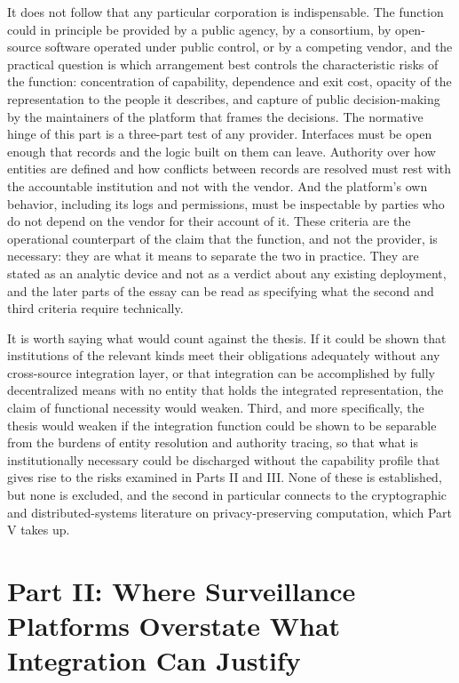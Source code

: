 \documentclass[11pt]{article}
\theoremstyle{plain}
\theoremstyle{definition}
\theoremstyle{remark}
\begin{document}
It does not follow that any particular corporation is indispensable. The function could in principle be provided by a public agency, by a consortium, by open-source software operated under public control, or by a competing vendor, and the practical question is which arrangement best controls the characteristic risks of the function: concentration of capability, dependence and exit cost, opacity of the representation to the people it describes, and capture of public decision-making by the maintainers of the platform that frames the decisions. The normative hinge of this part is a three-part test of any provider. Interfaces must be open enough that records and the logic built on them can leave. Authority over how entities are defined and how conflicts between records are resolved must rest with the accountable institution and not with the vendor. And the platform's own behavior, including its logs and permissions, must be inspectable by parties who do not depend on the vendor for their account of it. These criteria are the operational counterpart of the claim that the function, and not the provider, is necessary: they are what it means to separate the two in practice. They are stated as an analytic device and not as a verdict about any existing deployment, and the later parts of the essay can be read as specifying what the second and third criteria require technically.

It is worth saying what would count against the thesis. If it could be shown that institutions of the relevant kinds meet their obligations adequately without any cross-source integration layer, or that integration can be accomplished by fully decentralized means with no entity that holds the integrated representation, the claim of functional necessity would weaken. Third, and more specifically, the thesis would weaken if the integration function could be shown to be separable from the burdens of entity resolution and authority tracing, so that what is institutionally necessary could be discharged without the capability profile that gives rise to the risks examined in Parts II and III. None of these is established, but none is excluded, and the second in particular connects to the cryptographic and distributed-systems literature on privacy-preserving computation, which Part V takes up.

\section{Part II: Where Surveillance Platforms Overstate What Integration Can Justify}
\end{document}
